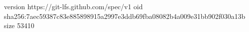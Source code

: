 version https://git-lfs.github.com/spec/v1
oid sha256:7aec59387c83e885898915a2997e3ddb69fba08082b4a009e31bb902f030a13b
size 53410
